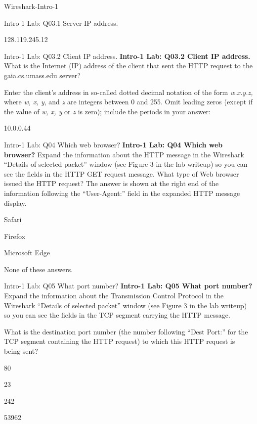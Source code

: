 \documentclass[a4paper]{article}
\begin{document}
\begin{quiz}{Wireshark-Intro-1}
\begin{shortanswer}[points=1]{Intro-1 Lab: Q03.1 Server IP address.}
\item 128.119.245.12
\end{shortanswer}

\begin{shortanswer}[points=1]{Intro-1 Lab: Q03.2 Client IP address.}
\textbf{Intro-1 Lab: Q03.2 Client IP address.}  
What is the Internet (IP) address of the client that sent the HTTP request to the gaia.cs.umass.edu server? 

Enter the client's address in so-called dotted decimal notation of the form \emph{w.x.y.z,} where \emph{w, x, y}, and \emph{z} are integers between 0 and 255. Omit leading zeros (except if the value of \emph{w, x, y} or \emph{z} is zero); include the periods in your answer:    

\item 10.0.0.44
\end{shortanswer}

\begin{multi}[points=1]{Intro-1 Lab: Q04 Which web browser?}
\textbf{Intro-1 Lab: Q04 Which web browser?}  
Expand the information about the HTTP message in the Wireshark ``Details of selected packet'' window (see Figure 3 in the lab writeup) so you can see the fields in the HTTP GET request message. What type of Web browser issued the HTTP request? The answer is shown at the right end of the information following the ``User-Agent:'' field in the expanded HTTP message display.

\item Safari
\item* Firefox
\item Microsoft Edge
\item None of these answers.
\end{multi}

\begin{multi}[points=1]{Intro-1 Lab: Q05 What port number?}
\textbf{Intro-1 Lab: Q05 What port number?} 
Expand the information about the Transmission Control Protocol in the Wireshark ``Details of selected packet'' window (see Figure 3 in the lab writeup) so you can see the fields in the TCP segment carrying the HTTP message.  

What is the destination port number (the number following ``Dest Port:'' for the TCP segment containing the HTTP request) to which this HTTP request is being sent? 

\item* 80
\item 23
\item 242
\item 53962
\end{multi}

\end{quiz}
\end{document}
